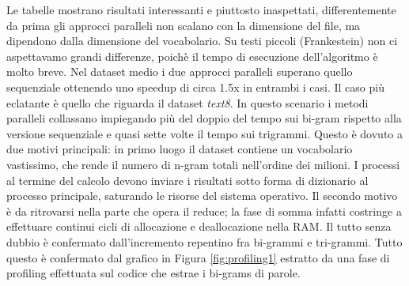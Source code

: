 \documentclass[10pt,twocolumn,letterpaper]{article}
\begin{document}
\begin{table}[ht]
\centering
\caption{Confronto prestazioni nel calcolo dei Tri-gram di parole (8 Core)}
\label{tab:performance_comparison}
\end{table}

Le tabelle mostrano risultati interessanti e piuttosto inaspettati, differentemente da prima gli approcci paralleli non scalano con la dimensione del file, ma dipendono dalla dimensione del vocabolario.
Su testi piccoli (Frankestein) non ci aspettavamo grandi differenze, poichè il tempo di esecuzione dell'algoritmo è molto breve.
Nel dataset medio i due approcci paralleli superano quello sequenziale ottenendo uno speedup di circa 1.5x in entrambi i casi. Il caso più eclatante è quello che riguarda il dataset \textit{text8}. In questo scenario i metodi paralleli collassano impiegando più del doppio del tempo sui bi-gram rispetto alla versione sequenziale e quasi sette volte il tempo sui trigrammi.
Questo è dovuto a due motivi principali: in primo luogo il dataset contiene un vocabolario vastissimo, che rende il numero di n-gram totali nell'ordine dei milioni. I processi al termine del calcolo devono inviare i risultati sotto forma di dizionario al processo principale, saturando le risorse del sistema operativo. Il secondo motivo è da ritrovarsi nella parte che opera il reduce; la fase di somma infatti costringe a effettuare continui cicli di allocazione e deallocazione nella RAM. Il tutto senza dubbio è confermato dall'incremento repentino fra bi-grammi e tri-grammi. Tutto questo è confermato dal grafico in Figura \ref{fig:profiling1} estratto da una fase di profiling effettuata sul codice che estrae i bi-grams di parole.
\end{document}

